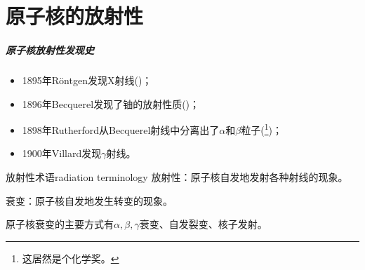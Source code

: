 \chapter{原子核的放射性}

\paragraph{原子核放射性发现史}
\begin{itemize}
	\item 1895年Röntgen发现X射线()；
	\item 1896年Becquerel发现了铀的放射性质()；
	\item 1898年Rutherford从Becquerel射线中分离出了$\alpha$和$\beta$粒子(\footnote{这居然是个化学奖。})；
	\item 1900年Villard发现$\gamma$射线。
\end{itemize}

\begin{definition}{放射性术语}{radiation terminology}
	放射性：原子核自发地发射各种射线的现象。


	衰变：原子核自发地发生转变的现象。
\end{definition}
原子核衰变的主要方式有$\alpha,\beta,\gamma$衰变、自发裂变、核子发射。

